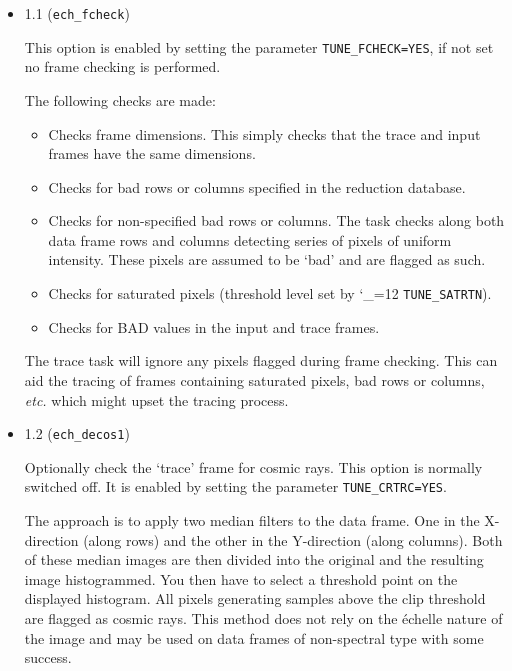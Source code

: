 \documentclass[11pt,twoside]{article}
\makeatletter
\newcommand{\htmlref}[2]{#1}
\newcommand{\xlabel}[1]{}
\newcommand{\mlabel}[1]{\xlabel{#1}\label{#1}}
\newcommand{\myindex}[1]{\index{#1}}
\newcommand{\indexcmdname}[1]{\index{#1@\protect\cmdname{#1}}}
\renewcommand{\myindex}[1]{}
\renewcommand{\indexcmdname}[1]{}
\newcommand{\cmdname}{\begingroup \catcode`\_=12 \realcmdname}
\newcommand{\realcmdname}[1]{\endgroup\texttt{#1}}
\makeatother
\begin{document}
\begin{itemize}


\item \mlabel{ech_fcheck} {1.1} (\texttt{ech\_fcheck})
\indexcmdname{TUNE_FCHECK}

This option is enabled by setting the parameter
\htmlref{{\tt TUNE\_FCHECK=YES}}{par_TUNE_FCHECK},
if not set no frame checking is performed.

The following checks are made:

\begin{itemize}

\item Checks frame dimensions.  This simply checks that the trace and input
      frames have the same dimensions.
\myindex{Frame!dimensions}

\item Checks for bad rows or columns specified in the reduction database.
\myindex{Bad row/column}

\item Checks for non-specified bad rows or columns.
      The task checks along both data frame rows and columns detecting
      series of pixels of uniform intensity.
      These pixels are assumed to be `bad' and are flagged as such.

\item Checks for saturated pixels (threshold level set by \cmdname{TUNE_SATRTN}).
\indexcmdname{TUNE_SATRTN}
\myindex{Saturated pixels}

\item Checks for BAD values in the input and trace frames.

\end{itemize}

The trace task will ignore any pixels flagged during frame checking.
This can aid the tracing of frames containing saturated pixels, bad rows or
columns, {\it{etc.}} which might upset the tracing process.


\item \mlabel{ech_decos1} {1.2} (\texttt{ech\_decos1})

Optionally check the `trace' frame for cosmic rays. This option is
normally switched off. It is enabled by setting the parameter
\htmlref{{\tt TUNE\_CRTRC=YES}}{par_TUNE_CRTRC}\@.
\myindex{Cosmic rays}
\indexcmdname{TUNE_CRTRC}
The approach is to apply two median filters to the data frame. One in
the X-direction (along rows) and the other in the Y-direction (along
columns). Both of these median images are then divided into the
original and the resulting image histogrammed. You then have to select a
threshold point on the displayed histogram. All
pixels generating samples above the clip threshold are flagged as
cosmic rays. This method does not rely on the \'{e}chelle nature of the
image and may be used on data frames of non-spectral type with some
success.



\end{itemize}
\end{document}
